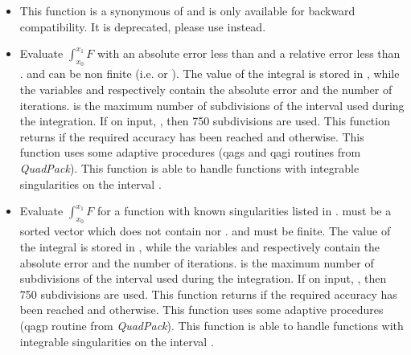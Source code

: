 \begin{itemize}
\item {}
  \sshortdescribe This function is a synonymous of
   and is only available for backward
  compatibility. It is deprecated, please use 
  instead.

\item {}
  \sshortdescribe Evaluate $\int_{x_0}^{x_1} F$ with an absolute error less
  than  and a relative error less than .  and
   can be non finite (i.e.  or ). The
  value of the integral is stored in , while the variables
   and  respectively contain the absolute error and the
  number of iterations.  is the maximum number of subdivisions of the
  interval  used during the integration. If on input, , then 750 subdivisions are used.  This function returns  if the
  required accuracy has been reached and  otherwise. This function
  uses some adaptive procedures (qags and qagi routines from {\it QuadPack}).
  This function is able to handle functions  with integrable
  singularities on the interval \var{[x0,x1]}.

\item {}
  \sshortdescribe Evaluate $\int_{x_0}^{x_1} F$  for a function
   with known singularities listed in .
   must be a sorted vector which does not contain 
  nor .   and  must be  finite. The value of the
  integral is stored in , while the variables  and
   respectively contain the absolute error and the number of
  iterations.  is the maximum number of subdivisions of the interval
   used during the integration. If on input, , then
  750 subdivisions are used.  This function returns  if the required
  accuracy has been reached and  otherwise. This function uses some
  adaptive procedures (qagp routine from {\it QuadPack}).  This function is
  able to handle functions  with integrable singularities on the interval
  \var{[x0,x1]}.
\end{itemize}


